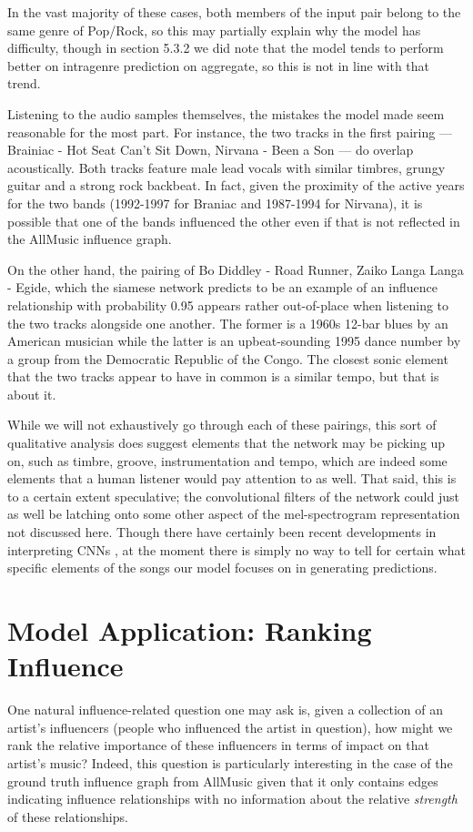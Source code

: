 In the vast majority of these cases, both members of the input pair belong to the same genre of Pop/Rock, so this may partially explain why the model has difficulty, though in section 5.3.2 we did note that the model tends to perform better on intragenre prediction on aggregate, so this is not in line with that trend.

Listening to the audio samples themselves, the mistakes the model made seem reasonable for the most part. For instance, the two tracks in the first pairing --- Brainiac - Hot Seat Can't Sit Down, Nirvana - Been a Son --- do overlap acoustically. Both tracks feature male lead vocals with similar timbres, grungy guitar and a strong rock backbeat. In fact, given the proximity of the active years for the two bands (1992-1997 for Braniac and 1987-1994 for Nirvana), it is possible that one of the bands influenced the other even if that is not reflected in the AllMusic influence graph.

On the other hand, the pairing of Bo Diddley - Road Runner, Zaiko Langa Langa - Egide, which the siamese network predicts to be an example of an influence relationship with probability 0.95 appears rather out-of-place when listening to the two tracks alongside one another. The former is a 1960s 12-bar blues by an American musician while the latter is an upbeat-sounding 1995 dance number by a group from the Democratic Republic of the Congo. The closest sonic element that the two tracks appear to have in common is a similar tempo, but that is about it.

While we will not exhaustively go through each of these pairings, this sort of qualitative analysis does suggest elements that the network may be picking up on, such as timbre, groove, instrumentation and tempo, which are indeed some elements that a human listener would pay attention to as well. That said, this is to a certain extent speculative; the convolutional filters of the network could just as well be latching onto some other aspect of the mel-spectrogram representation not discussed here. Though there have certainly been recent developments in interpreting CNNs \cite{olah2018the}, at the moment there is simply no way to tell for certain what specific elements of the songs our model focuses on in generating predictions.

\newpage
\section{Model Application: Ranking Influence}
One natural influence-related question one may ask is, given a collection of an artist's influencers (people who influenced the artist in question), how might we rank the relative importance of these influencers in terms of impact on that artist's music? Indeed, this question is particularly interesting in the case of the ground truth influence graph from AllMusic given that it only contains edges indicating influence relationships with no information about the relative \textit{strength} of these relationships.

